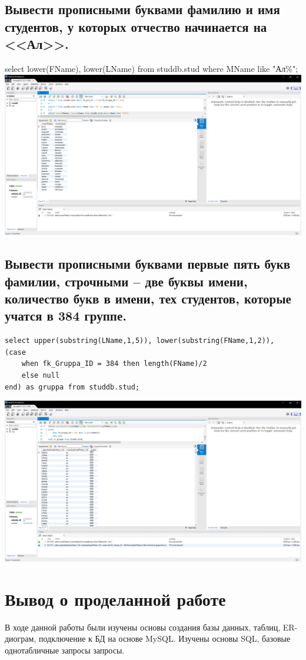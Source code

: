 \documentclass[a4paper, 12pt]{article}
\begin{document}
\subsection{Вывести прописными буквами фамилию и имя студентов, у которых отчество начинается на <<Ал>>.}
select lower(FName), lower(LName) from studdb.stud where MName like "Ал\%";\\
\includegraphics[width=\textwidth]{5-8.png}

\subsection{Вывести прописными буквами первые пять букв фамилии, строчными – две буквы имени, количество букв в имени, тех  студентов, которые учатся в 384 группе.}
\begin{lstlisting}
select upper(substring(LName,1,5)), lower(substring(FName,1,2)), 
(case
	when fk_Gruppa_ID = 384 then length(FName)/2
	else null
end) as gruppa from studdb.stud;  
\end{lstlisting}
\includegraphics[width=\textwidth]{5-9.png}


\section{Вывод о проделанной работе}
В ходе данной работы были изучены основы создания базы данных, таблиц, ER-диограм, подключение к БД на основе MySQL. Изучены основы SQL, базовые однотабличные запросы запросы. 
\end{document}

